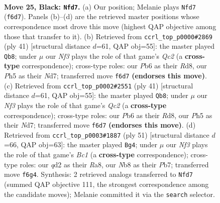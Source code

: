 \documentclass[11pt]{article}
\begin{document}
\clearpage

\begin{figure}[p]\centering
\begin{subfigure}{0.46\textwidth}\centering
\resizebox{\linewidth}{!}{%
\newchessgame
\chessboard[
  setfen={1n2r1k1/4qpp1/rp1pbn2/4p2p/P3P2N/2N3P1/B1PQ1P1P/R1R3K1 b - - 12 25},
  showmover=false,
  pgfstyle=straightmove, color=movearrow, markmove={f6-d7}
]}
\caption{}
\end{subfigure}\hfill
\begin{subfigure}{0.46\textwidth}\centering
\resizebox{\linewidth}{!}{%
\newchessgame
\chessboard[
  setfen={3rr1k1/1pqn1pp1/p1pb1n1p/P7/1P2P3/2NRBN1P/2Q2PP1/1R4K1 b - - 3 21},
  showmover=false,
  pgfstyle=straightmove, color=movearrow, markmove={c7-b8}
]}
\caption{}
\end{subfigure}
\\[4pt]
\begin{subfigure}{0.46\textwidth}\centering
\resizebox{\linewidth}{!}{%
\newchessgame
\chessboard[
  setfen={3rr1k1/1pqn1pp1/p1pb1n1p/P7/1P2P3/2NRBN1P/2Q2PP1/1R4K1 b - - 3 21},
  showmover=false,
  pgfstyle=straightmove, color=movearrow, markmove={c7-b8}
]}
\caption{}
\end{subfigure}\hfill
\begin{subfigure}{0.46\textwidth}\centering
\resizebox{\linewidth}{!}{%
\newchessgame
\chessboard[
  setfen={r1b1r1k1/1pn1qppp/2p2n2/8/p3PN2/6P1/P1Q2PBP/B2RR1K1 b - - 0 26},
  showmover=false,
  pgfstyle=straightmove, color=movearrow, markmove={c8-g4}
]}
\caption{}
\end{subfigure}
\caption{\textbf{Move 25, Black: \texttt{Nfd7}.} (a) Our position; Melanie plays \texttt{Nfd7} (\texttt{f6d7}). Panels (b)--(d) are the retrieved master positions whose correspondence most drove this move (highest QAP objective among those that transfer to it). (b) Retrieved from \texttt{ccrl\_top\_p0000\#2869} (ply 41) [structural distance $d$=61, QAP obj=55]: the master played \texttt{Qb8}; under $\mu$ our \emph{Nf3} plays the role of that game's \emph{Qc2} (a \textbf{cross-type} correspondence); cross-type roles: our \emph{P}b6 as their \emph{R}d8, our \emph{P}h5 as their \emph{N}d7; transferred move \texttt{f6d7} \textbf{(endorses this move)}. (c) Retrieved from \texttt{ccrl\_top\_p0002\#2551} (ply 41) [structural distance $d$=61, QAP obj=55]: the master played \texttt{Qb8}; under $\mu$ our \emph{Nf3} plays the role of that game's \emph{Qc2} (a \textbf{cross-type} correspondence); cross-type roles: our \emph{P}b6 as their \emph{R}d8, our \emph{P}h5 as their \emph{N}d7; transferred move \texttt{f6d7} \textbf{(endorses this move)}. (d) Retrieved from \texttt{ccrl\_top\_p0003\#1887} (ply 51) [structural distance $d$=66, QAP obj=63]: the master played \texttt{Bg4}; under $\mu$ our \emph{Nf3} plays the role of that game's \emph{Bc1} (a \textbf{cross-type} correspondence); cross-type roles: our \emph{q}d2 as their \emph{R}a8, our \emph{N}b8 as their \emph{P}b7; transferred move \texttt{f6g4}. Synthesis: 2 retrieved analogs transferred to \texttt{Nfd7} (summed QAP objective 111, the strongest correspondence among the candidate moves); Melanie committed it via the \texttt{search} selector.}
\label{fig:thought-m49}
\end{figure}
\end{document}
